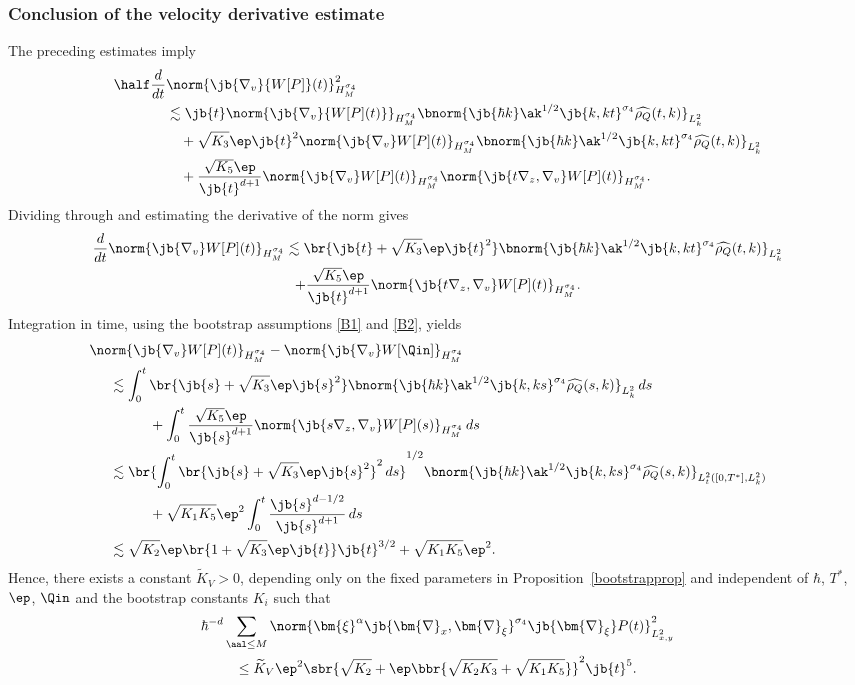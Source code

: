 \subsubsection{Conclusion of the velocity derivative estimate}\label{concluvelocity}
The preceding estimates imply
\begin{align*}
\half\frac{d}{dt}&\norm{\jb{\nabla_v}{W[P]}(t)}_{H^{\sigma_4}_M}^2\\
&\lesssim\jb{t}\norm{\jb{\nabla_v}{W[P](t)}}_{H^{\sigma_4}_M}\bnorm{\jb{\hbar k}\ak^{1/2}\jb{k,kt}^{\sigma_4}\widehat{\rho_Q}(t,k)}_{L^2_{k}}\\
&\quad+\sqrt{K_3}\ep\jb{t}^2\norm{\jb{\nabla_v}W[P](t)}_{H^{\sigma_4}_M}\bnorm{\jb{\hbar k}\ak^{1/2}\jb{k,kt}^{\sigma_4}\widehat{\rho_Q}(t,k)}_{L^2_k}\\
&\quad+\frac{\sqrt{K_5}\ep}{\jb{t}^{d+1}}\norm{\jb{\nabla_v}W[P](t)}_{H^{\sigma_4}_M}\norm{\jb{t\nabla_z,\nabla_v}W[P](t)}_{H^{\sigma_4}_M}.
\end{align*}
Dividing through and estimating the derivative of the norm gives
\begin{multline*}
\frac{d}{dt}\norm{\jb{\nabla_v}W[P](t)}_{H^{\sigma_4}_M}\lesssim\br{\jb{t}+\sqrt{K_3}\ep\jb{t}^2}\bnorm{\jb{\hbar k}\ak^{1/2}\jb{k,kt}^{\sigma_4}\widehat{\rho_Q}(t,k)}_{L^2_{k}}\\
+\frac{\sqrt{K_5}\ep}{\jb{t}^{d+1}}\norm{\jb{t\nabla_z,\nabla_v}W[P](t)}_{H^{\sigma_4}_M}.
\end{multline*}
Integration in time, using the bootstrap assumptions \eqref{B1} and \eqref{B2}, yields
\begin{align*}
&\hspace{-0.5cm}\norm{\jb{\nabla_v}W[P](t)}_{H^{\sigma_4}_M}-\norm{\jb{\nabla_v}W[\Qin]}_{H^{\sigma_4}_M}\\
&\lesssim\int_0^t\br{\jb{s}+\sqrt{K_3}\ep\jb{s}^2}\bnorm{\jb{\hbar k}\ak^{1/2}\jb{k,ks}^{\sigma_4}\widehat{\rho_Q}(s,k)}_{L^2_{k}}\,ds\\
&\hspace{1cm}+\int_0^t\frac{\sqrt{K_5}\ep}{\jb{s}^{d+1}}\norm{\jb{s\nabla_z,\nabla_v}W[P](s)}_{H^{\sigma_4}_M}\,ds\\
&\lesssim\br{\int_0^t\br{\jb{s}+\sqrt{K_3}\ep\jb{s}^2}^2\,ds}^{1/2}\bnorm{\jb{\hbar k}\ak^{1/2}\jb{k,ks}^{\sigma_4}\widehat{\rho_Q}(s,k)}_{L^2_{t}([0,T^*],L^2_k)}\\
&\hspace{1cm}+\sqrt{K_1K_5}\ep^2\int_0^t\frac{\jb{s}^{d-1/2}}{\jb{s}^{d+1}}\,ds\\
&\lesssim\sqrt{K_2}\ep\br{1+\sqrt{K_3}\ep\jb{t}}\jb{t}^{3/2}+\sqrt{K_1K_5}\ep^2.
\end{align*}
Hence, there exists a constant $\widetilde K_V>0$, depending only on the fixed parameters in Proposition~\ref{bootstrapprop} and independent of $\hbar$, $T^*$, $\ep$, $\Qin$ and the bootstrap constants $K_i$ such that
\begin{multline}
\hbar^{-d}\sum_{\aal\leq M}\norm{\bm{\xi}^\alpha\jb{\bm{\nabla}_x,\bm{\nabla}_\xi}^{\sigma_4}\jb{\bm{\nabla}_\xi}P(t)}_{L^2_{x,y}}^2\\
\leq \widetilde K_V\ep^2\sbr{\sqrt{K_2}+\ep\bbr{\sqrt{K_2K_3}+\sqrt{K_1K_5}}}^2\jb{t}^{5}.\label{B1vconc}
\end{multline}

